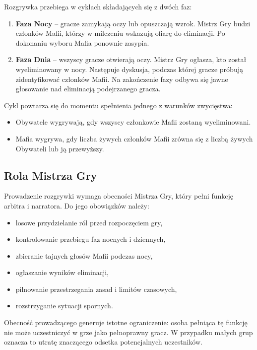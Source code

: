 ﻿\documentclass[a4paper,twoside,11pt]{mwrep}
\theoremstyle{plain} \newtheorem{thm}{Twierdzenie}
\theoremstyle{plain} \newtheorem{lem}{Lemat}
\theoremstyle{definition} \newtheorem{defn}{Definicja}
\theoremstyle{remark} \newtheorem*{rem}{Wniosek}
\begin{document}
Rozgrywka przebiega w cyklach składających się z dwóch faz:

\begin{enumerate}
    \item \textbf{Faza Nocy} -- gracze zamykają oczy lub opuszczają wzrok. Mistrz Gry budzi członków Mafii, którzy w milczeniu wskazują ofiarę do eliminacji. Po dokonaniu wyboru Mafia ponownie zasypia.
    
    \item \textbf{Faza Dnia} -- wszyscy gracze otwierają oczy. Mistrz Gry ogłasza, kto został wyeliminowany w nocy. Następuje dyskusja, podczas której gracze próbują zidentyfikować członków Mafii. Na zakończenie fazy odbywa się jawne głosowanie nad eliminacją podejrzanego gracza.
\end{enumerate}

Cykl powtarza się do momentu spełnienia jednego z warunków zwycięstwa:
\begin{itemize}
    \item Obywatele wygrywają, gdy wszyscy członkowie Mafii zostaną wyeliminowani.
    \item Mafia wygrywa, gdy liczba żywych członków Mafii zrówna się z liczbą żywych Obywateli lub ją przewyższy.
\end{itemize}

\subsection{Rola Mistrza Gry}

Prowadzenie rozgrywki wymaga obecności Mistrza Gry, który pełni funkcję arbitra i narratora. Do jego obowiązków należy:

\begin{itemize}
    \item losowe przydzielanie ról przed rozpoczęciem gry,
    \item kontrolowanie przebiegu faz nocnych i dziennych,
    \item zbieranie tajnych głosów Mafii podczas nocy,
    \item ogłaszanie wyników eliminacji,
    \item pilnowanie przestrzegania zasad i limitów czasowych,
    \item rozstrzyganie sytuacji spornych.
\end{itemize}

Obecność prowadzącego generuje istotne ograniczenie: osoba pełniąca tę funkcję nie może uczestniczyć w grze jako pełnoprawny gracz. W przypadku małych grup oznacza to utratę znaczącego odsetka potencjalnych uczestników.
\end{document}
